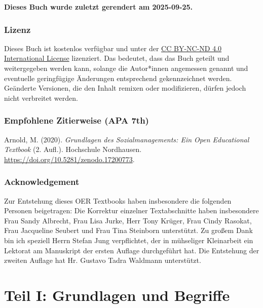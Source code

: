 \documentclass[
  letterpaper,
]{book}
\begin{document}
\textbf{Dieses Buch wurde zuletzt gerendert am 2025-09-25.}

\section*{Lizenz}\label{lizenz}


Dieses Buch ist kostenlos verfügbar und unter der
\href{https://creativecommons.org/licenses/by-nc-sa/4.0/}{CC BY-NC-ND
4.0 International License} lizenziert. Das bedeutet, dass das Buch
geteilt und weitergegeben werden kann, solange die Autor*innen
angemessen genannt und eventuelle geringfügige Änderungen entsprechend
gekennzeichnet werden. Geänderte Versionen, die den Inhalt remixen oder
modifizieren, dürfen jedoch nicht verbreitet werden.

\section*{Empfohlene Zitierweise (APA
7th)}\label{empfohlene-zitierweise-apa-7th}


Arnold, M. (2020). \emph{Grundlagen des Sozialmanagements: Ein Open
Educational Textbook} (2. Aufl.). Hochschule Nordhausen.
\url{https://doi.org/10.5281/zenodo.17200773}.

\section*{Acknowledgement}\label{acknowledgement}


Zur Entstehung dieses OER Textbooks haben insbesondere die folgenden
Personen beigetragen: Die Korrektur einzelner Textabschnitte haben
insbesondere Frau Sandy Albrecht, Frau Lisa Jurke, Herr Tony Krüger,
Frau Cindy Rasokat, Frau Jacqueline Seubert und Frau Tina Steinborn
unterstützt. Zu großem Dank bin ich speziell Herrn Stefan Jung
verpflichtet, der in mühseliger Kleinarbeit ein Lektorat am Manuskript
der ersten Auflage durchgeführt hat. Die Entstehung der zweiten Auflage
hat Hr. Gustavo Tadra Waldmann unterstützt.

\part{Teil I: Grundlagen und Begriffe}
\end{document}
